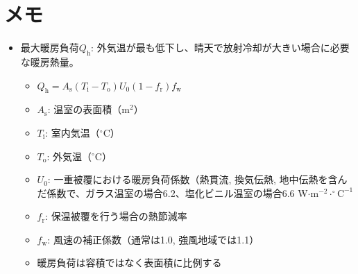 \documentclass[uplatex,dvipdfmx,nomag,a4paper,oneside,onecolumn,12pt]{bxjsreport} %
\begin{document}
\chapter{メモ}
\begin{itemize}
    \item 最大暖房負荷\(Q_\text{h}\): 外気温が最も低下し、晴天で放射冷却が大きい場合に必要な暖房熱量\cite{Samejima2021}。
    \begin{itemize}
        \item \(Q_\text{h} = A_\text{s} (T_\text{i} - T_\text{o}) U_\text{0} (1 - f_\text{r}) f_\text{w}\)
        \item \(A_\text{s}\): 温室の表面積（m\(^2\)）
        \item \(T_\text{i}\): 室内気温（\(^\circ \text{C}\)）
        \item \(T_\text{o}\): 外気温（\(^\circ \text{C}\)）
        \item \(U_\text{0}\): 一重被覆における暖房負荷係数（熱貫流, 換気伝熱, 地中伝熱を含んだ係数で、ガラス温室の場合6.2、塩化ビニル温室の場合6.6 W\(\cdot\)m\(^{-2}\cdot ^\circ \text{C}^{-1}\)
        \item \(f_\text{r}\): 保温被覆を行う場合の熱節減率
        \item \(f_\text{w}\): 風速の補正係数（通常は1.0,  強風地域では1.1）
        \item 暖房負荷は容積ではなく表面積に比例する
    \end{itemize}
\end{itemize}

\backmatter







\end{document}
